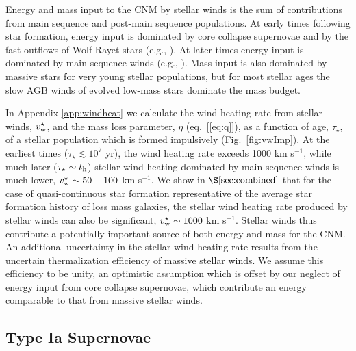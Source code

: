 \documentclass[usenatbib,fleqn]{mn2e}
\begin{document}
Energy and mass input to the CNM by stellar winds is the sum of contributions from main sequence and post-main sequence populations.  At early times following star formation, energy input is dominated by core collapse supernovae and by the fast outflows of Wolf-Rayet stars (e.g., \citealt{VossDiehl+:2009a}).  At later times energy input is dominated by main sequence winds (e.g., \citealt{NaimanSoares-Furtado+:2013a}).  Mass input is also dominated by massive stars for very young stellar populations, but for most stellar ages the slow AGB winds of evolved low-mass stars dominate the mass budget.  

In Appendix \ref{app:windheat} we calculate the wind heating rate from
stellar winds, $v_{\rm w}^{\star}$, and the mass loss parameter,
$\eta$ (eq.~[\ref{eq:q}]), as a function of age, $\tau_{\star}$, of a
stellar population which is formed impulsively (Fig.~\ref{fig:vwImp}).  
At the earliest times ($\tau_{\star} \lesssim 10^{7}$ yr), the wind
heating rate exceeds 1000 km s$^{-1}$, while much later ($\tau_{\star}
\sim t_{\rm h}$) stellar wind heating dominated by main sequence winds
is much lower, $v^{\star}_{\rm w} \sim 50-100 $ km s$^{-1}$.  We show
in $\S\ref{sec:combined}$ that for the case of quasi-continuous star
formation representative of the average star formation history of loss
mass galaxies, the stellar wind heating rate produced by stellar winds
can also be significant, $v_{\rm w}^{\star} \sim 1000$ km s$^{-1}$.  
Stellar winds thus contribute a potentially important source of both
energy and mass for the CNM.  An additional uncertainty in the stellar wind heating rate results from the uncertain thermalization efficiency of massive stellar winds.  We assume this efficiency to be unity, an optimistic assumption which is offset by our neglect of energy input from core collapse supernovae, which contribute an energy comparable to that from massive stellar winds.  

\subsection{Type Ia Supernovae} 
\end{document}
